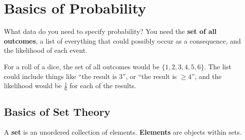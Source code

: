 
\section{Basics of Probability}

What data do you need to specify probability? You need the \textbf{set of all outcomes}, a list of everything that could possibly occur as a consequence, and the likelihood of each event.


\begin{eg}
	For a roll of a dice, the set of all outcomes would be \( \{1,2,3,4,5,6\}   \). The list could include things like ``the result is 3'', or ``the result is \( \ge 4 \)'', and the likelihood would be \( \frac{1}{6} \) for each of the results.
\end{eg}

\subsection{Basics of Set Theory}

\begin{definition}
	A \textbf{set} is an unordered collection of elements. \textbf{Elements} are objects within sets.
\end{definition}

